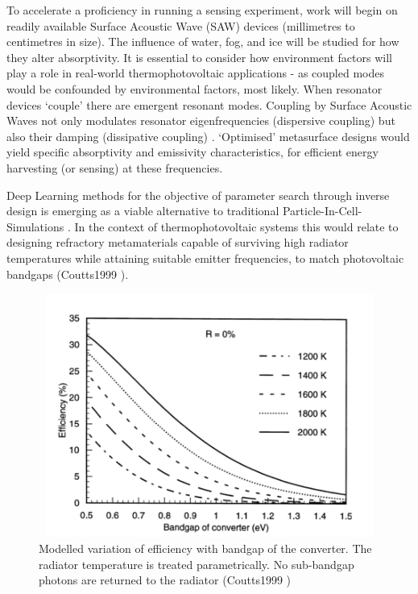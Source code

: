 To accelerate a proficiency in running a sensing experiment, work will begin on readily available Surface Acoustic Wave (SAW) devices (millimetres to centimetres in size). The influence of water, fog, and ice will be studied for how they alter absorptivity. It is essential to consider how environment factors will play a role in real-world thermophotovoltaic applications - as coupled modes would be confounded by environmental factors, most likely. When resonator devices `couple' there are emergent resonant modes. Coupling by Surface Acoustic Waves not only modulates resonator eigenfrequencies (dispersive coupling) but also their damping (dissipative coupling) \cite{Rieger2022SurfaceAW}. `Optimised' metasurface designs would yield specific absorptivity and emissivity characteristics, for efficient energy harvesting (or sensing) at these frequencies. 

Deep Learning methods for the objective of parameter search through inverse design is emerging as a viable alternative to traditional Particle-In-Cell-Simulations \cite{Nadell2019}. In the context of thermophotovoltaic systems this would relate to designing refractory metamaterials capable of surviving high radiator temperatures while attaining suitable emitter frequencies, to match photovoltaic bandgaps (Coutts1999 \cite{coutts1999}).

\begin{figure} [!h]
	\centering
	\includegraphics[width=14cm,height=8cm,keepaspectratio]{figures/introduction/tpv1.png}
	\setlength\belowcaptionskip{3pt}
	\caption{Modelled variation of efficiency with bandgap of the converter. The radiator temperature is treated parametrically. No sub-bandgap photons are returned to the radiator (Coutts1999 \cite{coutts1999})}
	\label{some-figure}
\end{figure}

